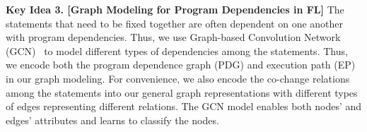 {\bf Key Idea 3. [Graph Modeling for Program Dependencies in FL]} The
statements that need to be fixed together are often dependent on one
another with program dependencies. Thus, we use Graph-based
Convolution Network (GCN)~\cite{li2019gcn} to model different types of
dependencies among the statements. Thus, we encode both the program
dependence graph (PDG) and execution path (EP) in our graph modeling.
For convenience, we also encode the co-change relations among the
statements into our general graph representations with different types
of edges representing different relations. The GCN model enables both
nodes' and edges' attributes and learns to classify the nodes.










